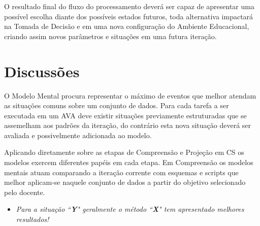 \documentclass[12pt]{article}
\begin{document}
O resultado final do fluxo do processamento deverá ser capaz de apresentar uma possível escolha diante dos possíveis estados futuros, toda alternativa impactará na Tomada de Decisão e em uma nova configuração do Ambiente Educacional, criando assim novos parâmetros e situações em uma futura iteração.







\section{Discussões}

O Modelo Mental procura representar o máximo de eventos que melhor atendam as situações comuns sobre um conjunto de dados. Para cada tarefa a ser executada em um AVA deve existir situações previamente estruturadas que se assemelham aos padrões da iteração, do contrário esta nova situação deverá ser avaliada e possivelmente adicionada ao modelo.

Aplicando diretamente sobre as etapas de Compreensão e Projeção em CS os modelos exercem diferentes papéis em cada etapa. Em Compreensão os modelos mentais atuam comparando a iteração corrente com esquemas e scripts que melhor aplicam-se naquele conjunto de dados a partir do objetivo selecionado pelo docente.

\begin{itemize}	
	\item \textit{Para a situação ``\textbf{Y}" geralmente o método ``\textbf{X}" tem apresentado melhores resultados!}
\end{itemize}
\end{document}
